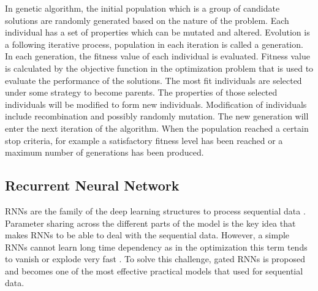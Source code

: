 In genetic algorithm, the initial population which is a group of candidate solutions are randomly generated based on the nature of the problem.
%
Each individual has a set of properties which can be mutated and altered.
%
Evolution is a following iterative process, population in each iteration is called a generation.
%
In each generation, the fitness value of each individual is evaluated.
%
Fitness value is calculated by the objective function in the optimization problem that is used to evaluate the performance of the solutions.
%
The most fit individuals are selected under some strategy to become parents. The properties of those selected individuals will be modified to form new individuals.
%
Modification of individuals include recombination and possibly randomly mutation.
%
The new generation will enter the next iteration of the algorithm.
%
When the population reached a certain stop criteria, for example a satisfactory fitness level has been reached or a maximum number of generations has been produced.


\subsection{Recurrent Neural Network}
RNNs are the family of the deep learning structures to process sequential data  \cite{rumelhart1986}.
%
Parameter sharing across the different parts of the model is the key idea that makes RNNs to be able to deal with the sequential data.
%
However, a simple RNNs cannot learn long time dependency as in the optimization this term tends to vanish or explode very fast \cite{goodfellow2016deeplearning}.
%
To solve this challenge, gated RNNs is proposed and becomes one of the most effective practical models that used for sequential data.

